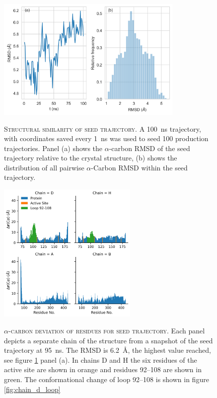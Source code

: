 \begin{figure}
    \centering
    \caption[Structural similarity of seed trajectory]{\textsc{Structural similarity of seed trajectory}. A \SI{100}{\nano\second} trajectory, with coordinates saved every \SI{1}{\nano\second} was used to seed \num{100} production trajectories.  Panel (a) shows the $\alpha$-carbon RMSD of the seed trajectory relative to the crystal structure, (b) shows the distribution of all pairwise $\alpha$-Carbon RMSD within the seed trajectory. }
    \includegraphics[width=0.8\textwidth]{chapters/aadh/figures/rmsd_seed_trajectory.png}
    \label{fig:rmsd_seed_traj}
\end{figure}
\begin{figure}
    \centering
    \caption[alpha-carbon deviation of residues from the seed trajectory]{\textsc{$\alpha$-carbon deviation of residues for seed trajectory}. Each panel depicts a separate chain of the structure from a snapshot of the seed trajectory at \SI{95}{\nano\second}. The RMSD is \SI{6.2}{\angstrom}, the highest value reached, see figure \ref{fig:rmsd_seed_traj} panel (a). In chains D and H the six residues of the active site are shown in orange and residues \numrange[range-phrase=\text{--}]{92}{108} are shown in green. The conformational change of loop \numrange[range-phrase=\text{--}]{92}{108} is shown in figure \ref{fig:chain_d_loop}}
    \includegraphics[width=0.6\textwidth]{chapters/aadh/figures/rmsd_by_res.png}
    \label{fig:aadh_rmsd_byres}
\end{figure}

